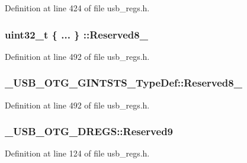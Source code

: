 Definition at line 424 of file usb\-\_\-regs.\-h.

\hypertarget{group___u_s_b___o_t_g___d_r_i_v_e_r_gae18067373c81cf648492842a14b8b0a8}{
\subsubsection[{Reserved8\-\_\-9}]{\setlength{\rightskip}{0pt plus 5cm}uint32\-\_\-t \{ ... \} \-::Reserved8\-\_}}\label{group___u_s_b___o_t_g___d_r_i_v_e_r_gae18067373c81cf648492842a14b8b0a8}


Definition at line 492 of file usb\-\_\-regs.\-h.

\hypertarget{group___u_s_b___o_t_g___d_r_i_v_e_r_gac282811c049c2f0186941c0813ffb4bb}{
\subsubsection[{Reserved8\-\_\-9}]{ \-\_\-\-U\-S\-B\-\_\-\-O\-T\-G\-\_\-\-G\-I\-N\-T\-S\-T\-S\-\_\-\-Type\-Def\-::\-Reserved8\-\_}}\label{group___u_s_b___o_t_g___d_r_i_v_e_r_gac282811c049c2f0186941c0813ffb4bb}


Definition at line 492 of file usb\-\_\-regs.\-h.

\hypertarget{group___u_s_b___o_t_g___d_r_i_v_e_r_gaa9a82782dd99d04af4174820c8266bcc}{
\subsubsection[{Reserved9}]{ \-\_\-\-U\-S\-B\-\_\-\-O\-T\-G\-\_\-\-D\-R\-E\-G\-S\-::\-Reserved9}}\label{group___u_s_b___o_t_g___d_r_i_v_e_r_gaa9a82782dd99d04af4174820c8266bcc}


Definition at line 124 of file usb\-\_\-regs.\-h.

